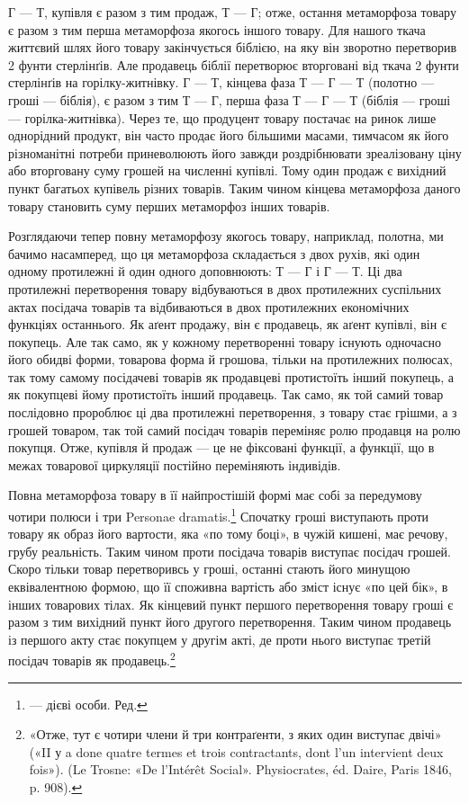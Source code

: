 Г — Т, купівля є разом з тим продаж, Т — Г; отже, остання
метаморфоза товару є разом з тим перша метаморфоза якогось
іншого товару. Для нашого ткача життєвий шлях його товару
закінчується біблією, на яку він зворотно перетворив 2 фунти
стерлінґів. Але продавець біблії перетворює вторговані від ткача
2 фунти стерлінґів на горілку-житнівку. Г — Т, кінцева фаза
Т — Г — Т (полотно — гроші — біблія), є разом з тим Т — Г,
перша фаза Т — Г — Т (біблія — гроші — горілка-житнівка).
Через те, що продуцент товару постачає на ринок лише однорідний
продукт, він часто продає його більшими масами, тимчасом
як його різноманітні потреби приневолюють його завжди
роздрібнювати зреалізовану ціну або вторговану суму грошей
на численні купівлі. Тому один продаж є вихідний пункт багатьох
купівель різних товарів. Таким чином кінцева метаморфоза
даного товару становить суму перших метаморфоз інших товарів.

Розглядаючи тепер повну метаморфозу якогось товару, наприклад,
полотна, ми бачимо насамперед, що ця метаморфоза
складається з двох рухів, які один одному протилежні й один
одного доповнюють: Т — Г і Г — Т. Ці два протилежні перетворення
товару відбуваються в двох протилежних суспільних
актах посідача товарів та відбиваються в двох протилежних
економічних функціях останнього. Як аґент продажу, він є продавець,
як аґент купівлі, він є покупець. Але так само, як у
кожному перетворенні товару існують одночасно його обидві
форми, товарова форма й грошова, тільки на протилежних полюсах,
так тому самому посідачеві товарів як продавцеві протистоїть
інший покупець, а як покупцеві йому протистоїть інший продавець.
Так само, як той самий товар послідовно пророблює ці два протилежні
перетворення, з товару стає грішми, а з грошей товаром, так
той самий посідач товарів переміняє ролю продавця на ролю покупця.
Отже, купівля й продаж — це не фіксовані функції, а функції,
що в межах товарової циркуляції постійно переміняють індивідів.

Повна метаморфоза товару в її найпростішій формі має собі
за передумову чотири полюси і три Personae dramatis.\footnote*{
— дієві особи. Ред.
} Спочатку
гроші виступають проти товару як образ його вартости, яка
«по тому боці», в чужій кишені, має речову, грубу реальність.
Таким чином проти посідача товарів виступає посідач грошей.
Скоро тільки товар перетворивсь у гроші, останні стають його
минущою еквівалентною формою, що її споживна вартість або
зміст існує «по цей бік», в інших товарових тілах. Як кінцевий
пункт першого перетворення товару гроші є разом з тим вихідний
пункт його другого перетворення. Таким чином продавець
із першого акту стає покупцем у другім акті, де проти нього
виступає третій посідач товарів як продавець.\footnote{
«Отже, тут є чотири члени й три контраґенти, з яких один виступає
двічі» («II у a done quatre termes et trois contractants, dont l’un intervient
deux fois»). (Le Trosne: «De l’Intérêt Social». Physiocrates, éd. Daire,
Paris 1846, p. 908).
}
